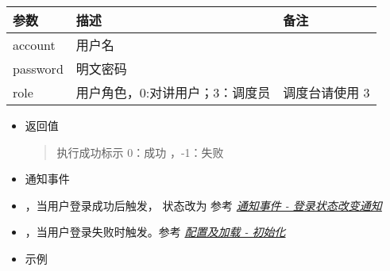 \documentclass[letterpaper,10pt,english]{sphinxmanual}
\begin{document}
\begin{savenotes}\sphinxattablestart
\centering
\begin{tabulary}{\linewidth}[t]{|T|T|T|}
\hline
\sphinxstyletheadfamily 
参数
&\sphinxstyletheadfamily 
描述
&\sphinxstyletheadfamily 
备注
\\
\hline
account
&
用户名
&\\
\hline
password
&
明文密码
&\\
\hline
role
&
用户角色，0:对讲用户；3：调度员
&
调度台请使用 3
\\
\hline
\end{tabulary}
\par
\sphinxattableend\end{savenotes}
\begin{itemize}
\item {} 
返回值
\begin{quote}

执行成功标示 0：成功 ，-1：失败
\end{quote}

\item {} 
通知事件

\item {} 
 ，当用户登录成功后触发，
状态改为  参考 {\hyperref[\detokenize{csharp:loginStatus}]{\emph{通知事件 -
登录状态改变通知}}}

\item {} 
，当用户登录失败时触发。参考 {\hyperref[\detokenize{csharp:init}]{\emph{配置及加载 -
初始化}}}

\item {} 
示例

\end{itemize}
\end{document}
